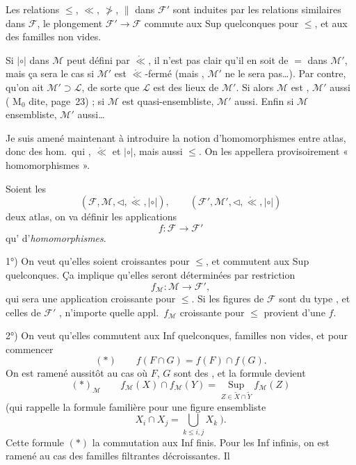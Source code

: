 \documentclass[11pt,a4paper]{article}
\begin{document}
Les relations $\leq$, $\ll$, \struck{\ill{}} $\not>$, $\parallel$ dans $\mathcal{F}'$ sont induites par les relations similaires dans $\mathcal{F}$, le plongement $\mathcal{F}' \to \mathcal{F}$ commute aux Sup quelconques pour $\leq$, et aux  des familles non vides.

Si $|\circ|$ dans $\mathcal{M}$ peut  défini par $\mathrel{\mathring{\ll}}$, il n'est pas clair qu'il en soit de $=$ dans $\mathcal{M}'$, mais ça sera le cas si $\mathcal{M}'$ est $\mathrel{\mathring{\ll}}$-fermé (mais  , $\mathcal{M}'$ ne le sera pas…). Par contre,  qu'on ait $\mathcal{M}' \supset \mathcal{L}$, de sorte que $\mathcal{L}$ est  \ill{} des lieux de $\mathcal{M}'$. Si alors $\mathcal{M}$ est , $\mathcal{M}'$ aussi ( $\mathrm{M}_0$ dite, page~23) ; \struck{\ill{}} si $\mathcal{M}$ est quasi-ensembliste, $\mathcal{M}'$ aussi. Enfin si $\mathcal{M}$ ensembliste, $\mathcal{M}'$ aussi…

Je suis amené maintenant à introduire  la notion d'homomorphismes entre atlas, donc des hom.\ qui ,  $\mathrel{\mathring{\ll}}$ et $|\circ|$, mais aussi $\leq$. On les appellera provisoirement « homomorphismes ».


Soient les
\[
  (\mathcal{F}, \mathcal{M}, \lhd, \mathrel{\mathring{\ll}}, |\circ|), \qquad
  (\mathcal{F}', \mathcal{M}', \lhd, \mathrel{\mathring{\ll}}, |\circ|)
\]
deux atlas, on va définir les applications
\[
  f : \mathcal{F} \longrightarrow \mathcal{F}'
\]
qu' \ill{} d'\emph{homomorphismes}.

1°) On veut qu'elles soient croissantes pour $\leq$, et commutent aux Sup quelconques. Ça implique qu'elles seront déterminées par  restriction \ill{}
\[
  f_{\mathcal{M}} : \mathcal{M} \longrightarrow \mathcal{F}',
\]
qui sera une application croissante pour $\leq$. Si les figures de $\mathcal{F}$ sont du type \ill{}, et celles de $\mathcal{F}'$ \ill{},  n'importe quelle appl.\ $f_{\mathcal{M}}$ croissante pour $\leq$ provient d'une $f$.

2°) On veut qu'elles commutent aux Inf quelconques,  familles  non vides, et pour commencer
\[
  (*) \qquad f(F \cap G) = f(F) \cap f(G).
\]
On est ramené aussitôt au cas où $F$, $G$ sont des \ill{}, et la formule devient
\[
  (*)_{\mathcal{M}} \qquad f_{\mathcal{M}}(X) \cap f_{\mathcal{M}}(Y) = \operatorname*{Sup}_{Z \in \widetilde{X} \cap \widetilde{Y}} f_{\mathcal{M}}(Z)
\]
(qui rappelle la formule familière pour une figure ensembliste
\[
  X_i \cap X_j = \bigcup_{k \leq i, j} X_k \ ).
\]
Cette formule $(*)$  la commutation aux Inf finis. Pour les Inf infinis, on est ramené au cas des familles \struck{\ill{}} filtrantes décroissantes. Il \ill{}
\end{document}
